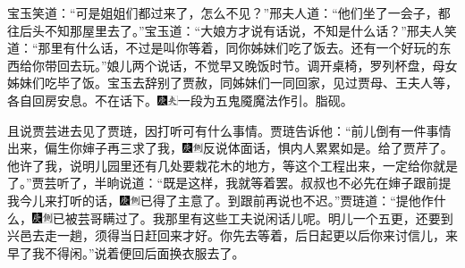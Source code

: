 宝玉笑道：``可是姐姐们都过来了，怎么不见？''邢夫人道：``他们坐了一会子，都往后头不知那屋里去了。''宝玉道：``大娘方才说有话说，不知是什么话？''邢夫人笑道：``那里有什么话，不过是叫你等着，同你姊妹们吃了饭去。还有一个好玩的东西给你带回去玩。''娘儿两个说话，不觉早又晚饭时节。调开桌椅，罗列杯盘，母女姊妹们吃毕了饭。宝玉去辞别了贾赦，同姊妹们一同回家，见过贾母、王夫人等，各自回房安息。不在话下。{\includegraphics[width=3mm]{../Images/00004}\includegraphics[width=3mm]{../Images/00012}\footnotesize \kaishu 一段为五鬼魇魔法作引。脂砚。}

且说贾芸进去见了贾琏，因打听可有什么事情。贾琏告诉他：``前儿倒有一件事情出来，偏生你婶子再三求了我，{\includegraphics[width=3mm]{../Images/00004}\includegraphics[width=3mm]{../Images/00011}\footnotesize \kaishu 反说体面话，惧内人累累如是。}给了贾芹了。他许了我，说明儿园里还有几处要栽花木的地方，等这个工程出来，一定给你就是了。''贾芸听了，半晌说道：``既是这样，我就等着罢。叔叔也不必先在婶子跟前提我今儿来打听的话，{\includegraphics[width=3mm]{../Images/00004}\includegraphics[width=3mm]{../Images/00011}\footnotesize \kaishu 已得了主意了。}到跟前再说也不迟。''贾琏道：``提他作什么，{\includegraphics[width=3mm]{../Images/00004}\includegraphics[width=3mm]{../Images/00011}\footnotesize \kaishu 已被芸哥瞒过了。}我那里有这些工夫说闲话儿呢。明儿一个五更，还要到兴邑去走一趟，须得当日赶回来才好。你先去等着，后日起更以后你来讨信儿，来早了我不得闲。''说着便回后面换衣服去了。


